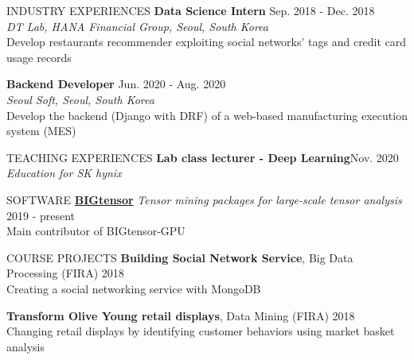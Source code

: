 \documentclass[10pt]{resume} %
\begin{document}

\begin{rSection}{INDUSTRY EXPERIENCES}
{\bf Data Science Intern} \hfill Sep. 2018 - Dec. 2018 \\ 
\textit{DT Lab, HANA Financial Group, Seoul, South Korea} \\
Develop restaurants recommender exploiting social networks' tags and credit card usage records
%

{\bf Backend Developer} \hfill Jun. 2020 - Aug. 2020 \\
\textit{Seoul Soft, Seoul, South Korea }\\
Develop the backend (Django with DRF) of a web-based manufacturing execution system (MES)
\end{rSection}


\begin{rSection}{TEACHING EXPERIENCES} 
{\bf Lab class lecturer - Deep Learning}\hfill Nov. 2020 \\
\textit{Education for SK hynix} \\
\end{rSection}

\begin{rSection}{SOFTWARE}
\href{https://datalab.snu.ac.kr/bigtensor/}{\bf BIGtensor} 
\textit{Tensor mining packages for large-scale tensor analysis } \hfill 2019 - present \\ 
Main contributor of BIGtensor-GPU
\end{rSection}


\begin{rSection}{COURSE PROJECTS}
{\bf Building Social Network Service}, Big Data Processing (FIRA) \hfill 2018\\
Creating a social networking service with MongoDB

%
{\bf Transform Olive Young retail displays}, Data Mining (FIRA) \hfill  2018\\
Changing retail displays by identifying customer behaviors using market basket analysis
\end{rSection}
\end{document}
